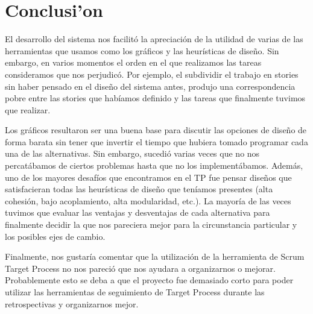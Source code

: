 \section{Conclusi'on}

El desarrollo del sistema nos facilitó la apreciación de la utilidad de varias de las herramientas
que usamos como los gráficos y las heurísticas de diseño. Sin embargo, en varios momentos
el orden en el que realizamos las tareas consideramos que nos perjudicó. Por ejemplo, el
subdividir el trabajo en stories sin haber pensado en el diseño del sistema antes, produjo
una correspondencia pobre entre las stories que habíamos definido y las tareas que finalmente
tuvimos que realizar.

Los gráficos resultaron ser una buena base para discutir las opciones de diseño de forma barata
sin tener que invertir el tiempo que hubiera tomado programar cada una de las alternativas. Sin embargo,
sucedió varias veces que no nos percatábamos de ciertos problemas hasta que no los implementábamos.
Además, uno de los mayores desafíos que encontramos en el TP fue pensar diseños que satisfacieran
todas las heurísticas de diseño que teníamos presentes (alta cohesión, bajo acoplamiento, alta modularidad, etc.).
La mayoría de las veces tuvimos que evaluar las ventajas y desventajas de cada alternativa para finalmente 
decidir la que nos pareciera mejor para la circunstancia particular y los posibles ejes de cambio.

Finalmente, nos gustaría comentar que la utilización de la herramienta de Scrum Target Process no nos 
pareció que nos ayudara a organizarnos o mejorar. Probablemente esto se deba a que el proyecto fue demasiado
corto para poder utilizar las herramientas de seguimiento de Target Process durante las retrospectivas
y organizarnos mejor.
